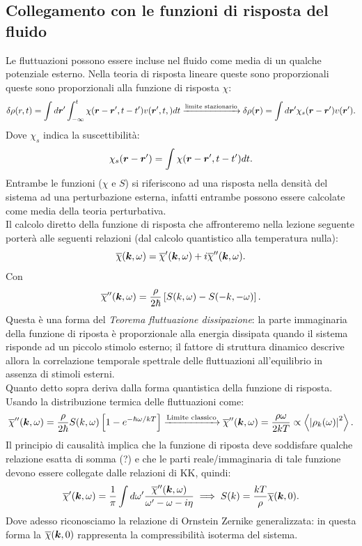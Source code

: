 \subsection{Collegamento con le funzioni di risposta del fluido}
\label{subsec:Collegamento con le funzioni di risposta del fluido}
Le fluttuazioni possono essere incluse nel fluido come media di un qualche potenziale esterno. Nella teoria di risposta lineare queste sono proporzionali queste sono proporzionali alla funzione di risposta $\chi$:
 \[
	 \delta\rho (r,t)=\int d\boldsymbol{r}'\int_{-\infty}^{t} 
	 \chi(\boldsymbol{r}-\boldsymbol{r}',t-t') v(\boldsymbol{r}',t,)dt
	 \xrightarrow{\text{limite stazionario}}
	 \delta\rho (\boldsymbol{r})=\int d\boldsymbol{r}'\chi_s(\boldsymbol{r}-\boldsymbol{r}')v(\boldsymbol{r}')
.\] 
Dove $\chi_s$ indica la suscettibilità:
\[
	\chi_s(\boldsymbol{r}-\boldsymbol{r}') = \int\chi(\boldsymbol{r}-\boldsymbol{r}',t-t')dt
.\] 
Entrambe le funzioni ($\chi$ e $S$) si riferiscono ad una risposta nella densità del sistema ad una perturbazione esterna, infatti entrambe possono essere calcolate come media della teoria perturbativa.\\
Il calcolo diretto della funzione di risposta che affronteremo nella lezione seguente porterà alle seguenti relazioni (dal calcolo quantistico alla temperatura nulla):
\[
	\overline{\chi}(\boldsymbol{k},\omega ) = \overline{\chi}'(\boldsymbol{k},\omega )
	+ i \overline{\chi}''(\boldsymbol{k},\omega )
.\] 
Con 
\[
	\overline{\chi}''(\boldsymbol{k},\omega ) = \frac{\rho }{2\hbar}
	\left[ S(k,\omega )-S(-k,-\omega ) \right] 
.\]
Questa è una forma del \textit{Teorema fluttuazione dissipazione}: la parte immaginaria della funzione di riposta è proporzionale alla energia dissipata quando il sistema risponde ad un piccolo stimolo esterno; il fattore di struttura dinamico descrive allora la correlazione temporale spettrale delle fluttuazioni all'equilibrio in assenza di stimoli esterni.\\
Quanto detto sopra deriva dalla forma quantistica della funzione di risposta. Usando la distribuzione termica delle fluttuazioni come:
\[
	\overline{\chi}''(\boldsymbol{k}, \omega ) = \frac{\rho }{2\hbar}S(k,\omega )
	\left[ 1- e^{-\hbar\omega /kT}  \right] 
	\xrightarrow{\text{Limite classico}}
	\overline{\chi}''(\boldsymbol{k},\omega ) = \frac{\rho \omega }{2kT} 
	\propto \left<\left| \rho _k(\omega ) \right| ^2 \right>
.\]
Il principio di causalità implica che la funzione di riposta deve soddisfare qualche relazione esatta di somma (?) e che le parti reale/immaginaria di tale funzione devono essere collegate dalle relazioni di KK, quindi:
\[
	\overline{\chi}'(\boldsymbol{k},\omega ) 
	= \frac{1}{\pi}\int d\omega' 
	\frac{\overline{\chi}''(\boldsymbol{k},\omega )}{\omega '-\omega -i\eta}
	\implies
	S(k) = \frac{kT}{\rho }\overline{\chi}(\boldsymbol{k},0)
.\] 
Dove adesso riconosciamo la relazione di Ornstein Zernike generalizzata: in questa forma la $\overline{\chi}(\boldsymbol{k},0)$ rappresenta la compressibilità isoterma del sistema.
